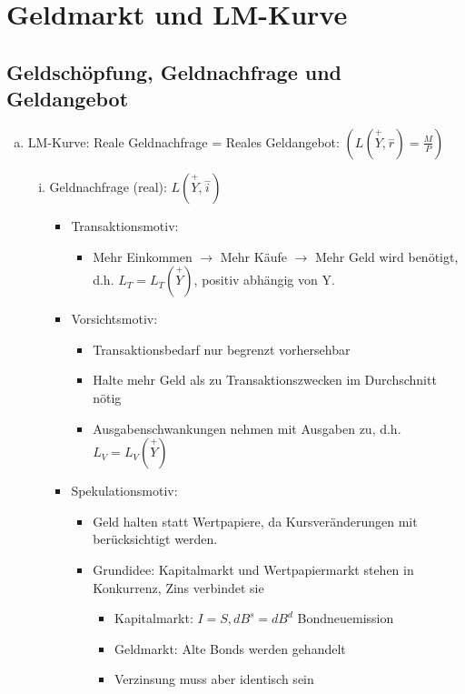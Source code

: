 \documentclass{scrartcl}
\begin{document}
\section{Geldmarkt und LM-Kurve}
\subsection{Geldsch\"{o}pfung, Geldnachfrage und Geldangebot}
\begin{enumerate}[(a)]
    \item LM-Kurve: Reale Geldnachfrage = Reales Geldangebot: $(L(\overset{+}{Y},\overset{-}{r})=\frac{M}{P})$
    \begin{enumerate}[(i)]
    \item Geldnachfrage (real): $L(\overset{+}{Y},\overset{-}{i})$
    \begin{itemize}
      \item Transaktionsmotiv:
      \begin{itemize}
      \item Mehr Einkommen $\rightarrow$ Mehr K\"{a}ufe $\rightarrow$ Mehr Geld wird ben\"{o}tigt, d.h. $L_T=L_T(\overset{+}{Y})$, positiv abh\"{a}ngig von Y.
      \end{itemize}
      \item Vorsichtsmotiv:
      \begin{itemize}
      \item Transaktionsbedarf nur begrenzt vorhersehbar
      \item Halte mehr Geld als zu Transaktionszwecken im Durchschnitt n\"{o}tig
      \item Ausgabenschwankungen nehmen mit Ausgaben zu, d.h. $L_V=L_V(\overset{+}{Y})$
      \end{itemize}
      \item Spekulationsmotiv:
        \begin{itemize}
          \item Geld halten statt Wertpapiere, da Kursver\"{a}nderungen mit ber\"{u}cksichtigt werden.
          \item Grundidee: Kapitalmarkt und Wertpapiermarkt stehen in Konkurrenz, Zins verbindet sie
          \begin{itemize}
          \item Kapitalmarkt: $I=S, dB^s=dB^d$ Bondneuemission
          \item Geldmarkt: Alte Bonds werden gehandelt
          \item Verzinsung muss aber identisch sein
          \end{itemize}

\end{itemize}
\end{itemize}
\end{enumerate}
\end{enumerate}
\end{document}
